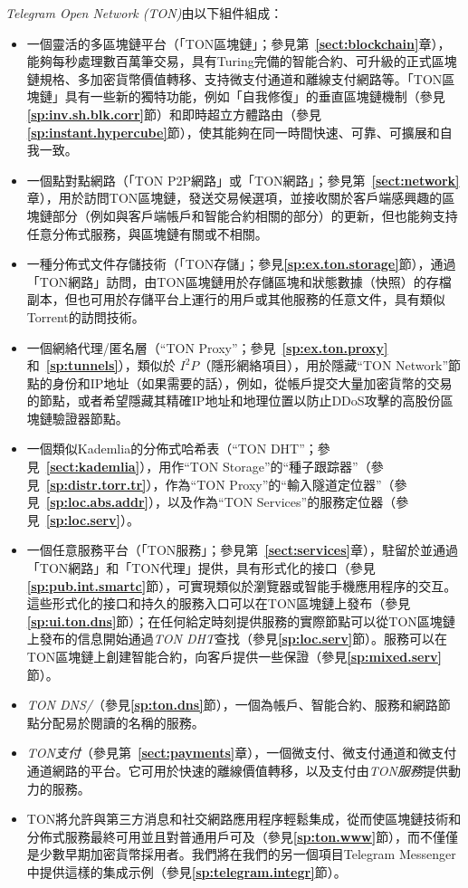 \documentclass[12pt,oneside]{article}
\def\refpoint#1{{\rm\textbf{\ref{#1}}}}
\let\ptref=\refpoint
\begin{document}
{\em Telegram Open Network (TON)}由以下組件組成：
\begin{itemize}
\item 一個靈活的多區塊鏈平台（「TON區塊鏈」；參見第~\ptref{sect:blockchain}章），能夠每秒處理數百萬筆交易，具有Turing完備的智能合約、可升級的正式區塊鏈規格、多加密貨幣價值轉移、支持微支付通道和離線支付網路等。「TON區塊鏈」具有一些新的獨特功能，例如「自我修復」的垂直區塊鏈機制（參見\ptref{sp:inv.sh.blk.corr}節）和即時超立方體路由（參見\ptref{sp:instant.hypercube}節），使其能夠在同一時間快速、可靠、可擴展和自我一致。
\item 一個點對點網路（「TON P2P網路」或「TON網路」；參見第~\ptref{sect:network}章），用於訪問TON區塊鏈，發送交易候選項，並接收關於客戶端感興趣的區塊鏈部分（例如與客戶端帳戶和智能合約相關的部分）的更新，但也能夠支持任意分佈式服務，與區塊鏈有關或不相關。
\item 一種分佈式文件存儲技術（「TON存儲」；參見\ptref{sp:ex.ton.storage}節），通過「TON網路」訪問，由TON區塊鏈用於存儲區塊和狀態數據（快照）的存檔副本，但也可用於存儲平台上運行的用戶或其他服務的任意文件，具有類似Torrent的訪問技術。
\item 一個網絡代理/匿名層（“TON Proxy”；參見~\ptref{sp:ex.ton.proxy} 和~\ptref{sp:tunnels}），類似於 $I^2P$（隱形網絡項目），用於隱藏“TON Network”節點的身份和IP地址（如果需要的話），例如，從帳戶提交大量加密貨幣的交易的節點，或者希望隱藏其精確IP地址和地理位置以防止DDoS攻擊的高股份區塊鏈驗證器節點。
\item 一個類似Kademlia的分佈式哈希表（“TON DHT”；參見~\ptref{sect:kademlia}），用作“TON Storage”的“種子跟踪器”（參見~\ptref{sp:distr.torr.tr}），作為“TON Proxy”的“輸入隧道定位器”（參見~\ptref{sp:loc.abs.addr}），以及作為“TON Services”的服務定位器（參見~\ptref{sp:loc.serv}）。
\item 一個任意服務平台（「TON服務」；參見第~\ptref{sect:services}章），駐留於並通過「TON網路」和「TON代理」提供，具有形式化的接口（參見\ptref{sp:pub.int.smartc}節），可實現類似於瀏覽器或智能手機應用程序的交互。這些形式化的接口和持久的服務入口可以在TON區塊鏈上發布（參見\ptref{sp:ui.ton.dns}節）；在任何給定時刻提供服務的實際節點可以從TON區塊鏈上發布的信息開始通過{\em TON DHT}查找（參見\ptref{sp:loc.serv}節）。服務可以在TON區塊鏈上創建智能合約，向客戶提供一些保證（參見\ptref{sp:mixed.serv}節）。
\item {\em TON DNS/}（參見\ptref{sp:ton.dns}節），一個為帳戶、智能合約、服務和網路節點分配易於閱讀的名稱的服務。
\item {\em TON支付}（參見第~\ptref{sect:payments}章），一個微支付、微支付通道和微支付通道網路的平台。它可用於快速的離線價值轉移，以及支付由{\em TON服務}提供動力的服務。
\item TON將允許與第三方消息和社交網路應用程序輕鬆集成，從而使區塊鏈技術和分佈式服務最終可用並且對普通用戶可及（參見\ptref{sp:ton.www}節），而不僅僅是少數早期加密貨幣採用者。我們將在我們的另一個項目Telegram Messenger中提供這樣的集成示例（參見\ptref{sp:telegram.integr}節）。
\end{itemize}
\end{document}
